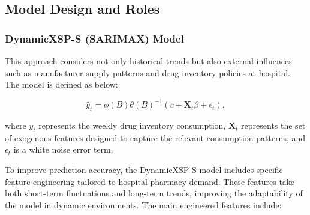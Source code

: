 \documentclass[journal]{IEEEtran}
\begin{document}
\subsection{Model Design and Roles}
\subsubsection{DynamicXSP-S (SARIMAX) Model}

This approach considers not only historical trends but also external influences such as manufacturer supply patterns and drug inventory policies at hospital. The model is defined as below:

\begin{equation}
    \hat{y}_{t} = \phi(B)\theta(B)^{-1} \left( c + \mathbf{X}_{t}\beta + \epsilon_{t} \right),
\end{equation}

where \(y_{t}\) represents the weekly drug inventory consumption, \(\mathbf{X}_{t}\) represents the set of exogenous features designed to capture the relevant consumption patterns, and \(\epsilon_{t}\) is a white noise error term.

To improve prediction accuracy, the DynamicXSP-S model includes specific feature engineering tailored to hospital pharmacy demand. These features take both short-term fluctuations and long-term trends, improving the adaptability of the model in dynamic environments. The main engineered features include:
\end{document}
